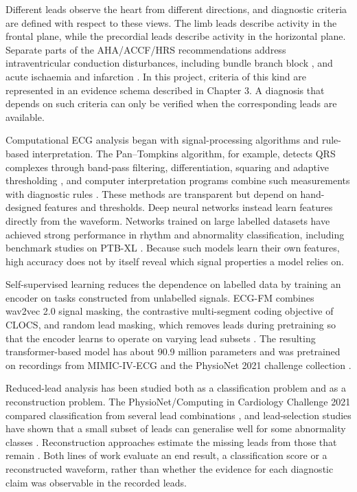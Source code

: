 Different leads observe the heart from different directions, and diagnostic criteria are defined with respect to these views. The limb leads describe activity in the frontal plane, while the precordial leads describe activity in the horizontal plane. Separate parts of the AHA/ACCF/HRS recommendations address intraventricular conduction disturbances, including bundle branch block \cite{SURAWICZ2009AHA}, and acute ischaemia and infarction \cite{WAGNER2009AHA}. In this project, criteria of this kind are represented in an evidence schema described in Chapter 3. A diagnosis that depends on such criteria can only be verified when the corresponding leads are available.

Computational ECG analysis began with signal-processing algorithms and rule-based interpretation. The Pan--Tompkins algorithm, for example, detects QRS complexes through band-pass filtering, differentiation, squaring and adaptive thresholding \cite{PAN1985QRS}, and computer interpretation programs combine such measurements with diagnostic rules \cite{SCHLAPFER2017COMPUTER}. These methods are transparent but depend on hand-designed features and thresholds. Deep neural networks instead learn features directly from the waveform. Networks trained on large labelled datasets have achieved strong performance in rhythm and abnormality classification, including benchmark studies on PTB-XL \cite{HANNUN2019CARDIOLOGIST,STRODTHOFF2021PTBXL}. Because such models learn their own features, high accuracy does not by itself reveal which signal properties a model relies on.

Self-supervised learning reduces the dependence on labelled data by training an encoder on tasks constructed from unlabelled signals. ECG-FM combines wav2vec 2.0 signal masking, the contrastive multi-segment coding objective of CLOCS, and random lead masking, which removes leads during pretraining so that the encoder learns to operate on varying lead subsets \cite{MCKEEN2025ECGFM,OH2022LEADAGNOSTIC}. The resulting transformer-based model has about 90.9 million parameters and was pretrained on recordings from MIMIC-IV-ECG and the PhysioNet 2021 challenge collection \cite{MCKEEN2025ECGFM}.

Reduced-lead analysis has been studied both as a classification problem and as a reconstruction problem. The PhysioNet/Computing in Cardiology Challenge 2021 compared classification from several lead combinations \cite{REYNA2022ISSUES}, and lead-selection studies have shown that a small subset of leads can generalise well for some abnormality classes \cite{LAI2021LEADSELECTION}. Reconstruction approaches estimate the missing leads from those that remain \cite{PRESACAN2025RECON}. Both lines of work evaluate an end result, a classification score or a reconstructed waveform, rather than whether the evidence for each diagnostic claim was observable in the recorded leads.

